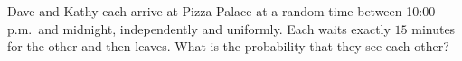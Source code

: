 Dave and Kathy each arrive at Pizza Palace at a random time between 10:00 p.m.\ and midnight, independently and uniformly. Each waits exactly $15$ minutes for the other and then leaves. What is the probability that they see each other?
